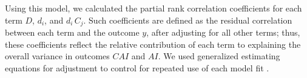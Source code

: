 Using this model, we calculated the partial rank correlation coefficients \cite{Kim2015}
for each term $D$, $d_i$, and $d_i\,C_j$.
Such coefficients are defined as the residual correlation between each term and the outcome $y$,
after adjusting for all other terms;
thus, these coefficients reflect the relative contribution of each term
to explaining the overall variance in outcomes $CAI$ and $AI$.
We used generalized estimating equations for adjustment
to control for repeated use of each model fit \cite{Halekoh2006}.
\endgroup

